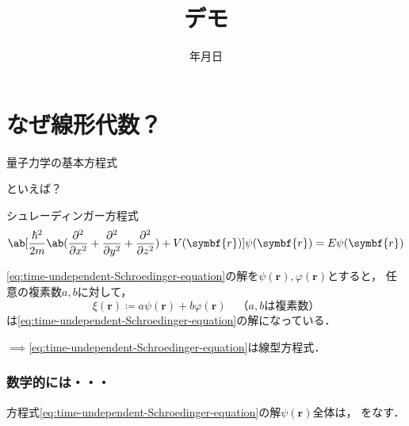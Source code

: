 \documentclass[
    10pt,
    ]{sotsu-beamer}
\begin{document}
\title{デモ}
\date{\number\year 年\number\month 月\number\day 日}


\begin{frame}

    \maketitle

\end{frame}


\section{なぜ線形代数？}


\begin{frame}{量子力学の基本方程式}

    といえば？

    \pause

    \begin{block}{シュレーディンガー方程式}
        \begin{equation}
            \label{eq:time-undependent-Schroedinger-equation}
            \ab[ \frac{\hbar^2}{2m} \ab( \pdv[2]{}{x} + \pdv[2]{}{y} + \pdv[2]{}{z} ) + V(\symbf{r})] \psi(\symbf{r}) = E \psi(\symbf{r})
        \end{equation}
    \end{block}

    \pause
    
    \eqref{eq:time-undependent-Schroedinger-equation}の解を$\psi(\symbf{r}), \varphi(\symbf{r})$とすると，
    任意の複素数$a, b$に対して，
    \[  \xi(\symbf{r}) \coloneq a \psi(\symbf{r}) + b \varphi(\symbf{r}) 
        \quad \text{（$a, b$は複素数）}  \]
    は\eqref{eq:time-undependent-Schroedinger-equation}の解になっている．

    \pause

    $\implies$\alert{\eqref{eq:time-undependent-Schroedinger-equation}は線型方程式}．

\end{frame}



\begin{frame}
    \label{frame:psi-is-vector}
    \frametitle{数学的には・・・}

    \begin{center}
        方程式\eqref{eq:time-undependent-Schroedinger-equation}の解$\psi(\symbf{r})$全体は，
        をなす．
    \end{center}

\end{frame}
\end{document}
